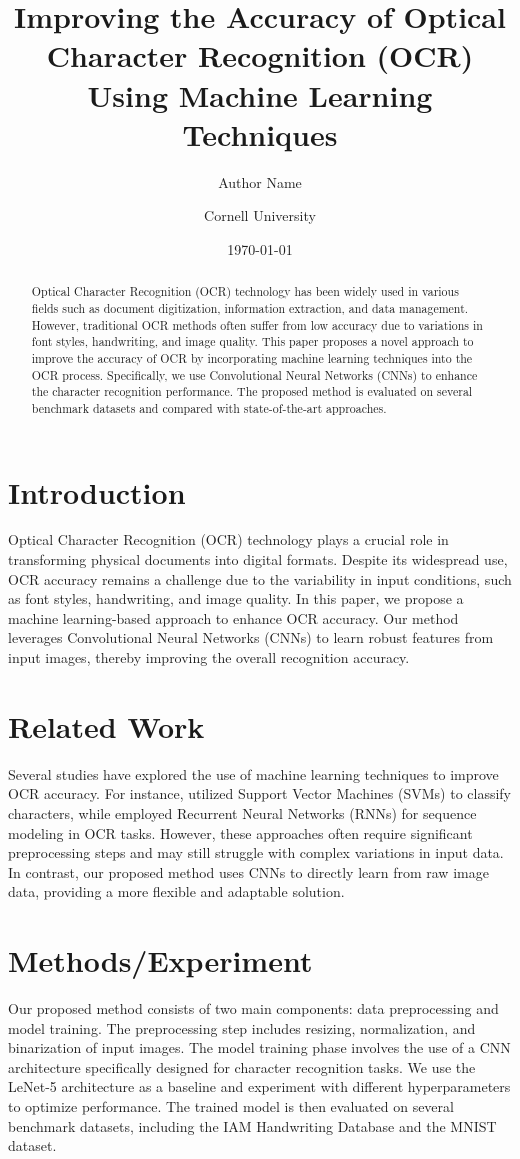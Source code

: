 \documentclass{article}
\title{Improving the Accuracy of Optical Character Recognition (OCR) Using Machine Learning Techniques}
\author{Author Name \and Cornell University}
\date{\today}
\begin{document}
\maketitle

\begin{abstract}
Optical Character Recognition (OCR) technology has been widely used in various fields such as document digitization, information extraction, and data management. However, traditional OCR methods often suffer from low accuracy due to variations in font styles, handwriting, and image quality. This paper proposes a novel approach to improve the accuracy of OCR by incorporating machine learning techniques into the OCR process. Specifically, we use Convolutional Neural Networks (CNNs) to enhance the character recognition performance. The proposed method is evaluated on several benchmark datasets and compared with state-of-the-art approaches.
\end{abstract}

\section{Introduction}
Optical Character Recognition (OCR) technology plays a crucial role in transforming physical documents into digital formats. Despite its widespread use, OCR accuracy remains a challenge due to the variability in input conditions, such as font styles, handwriting, and image quality. In this paper, we propose a machine learning-based approach to enhance OCR accuracy. Our method leverages Convolutional Neural Networks (CNNs) to learn robust features from input images, thereby improving the overall recognition accuracy.

\section{Related Work}
Several studies have explored the use of machine learning techniques to improve OCR accuracy. For instance, \cite{ref1} utilized Support Vector Machines (SVMs) to classify characters, while \cite{ref2} employed Recurrent Neural Networks (RNNs) for sequence modeling in OCR tasks. However, these approaches often require significant preprocessing steps and may still struggle with complex variations in input data. In contrast, our proposed method uses CNNs to directly learn from raw image data, providing a more flexible and adaptable solution.

\section{Methods/Experiment}
Our proposed method consists of two main components: data preprocessing and model training. The preprocessing step includes resizing, normalization, and binarization of input images. The model training phase involves the use of a CNN architecture specifically designed for character recognition tasks. We use the LeNet-5 architecture as a baseline and experiment with different hyperparameters to optimize performance. The trained model is then evaluated on several benchmark datasets, including the IAM Handwriting Database and the MNIST dataset.
\end{document}
